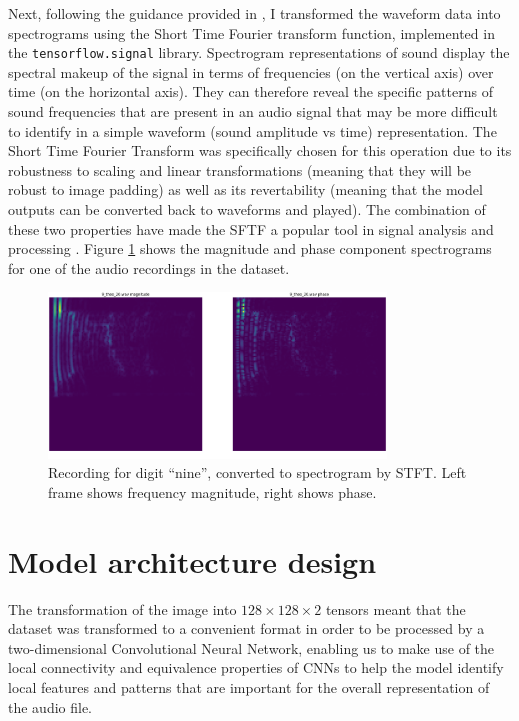 \documentclass[11pt,a4paper]{article}
\begin{document}
Next, following the guidance provided in \cite{audio_deep_learning,audio_deep_learning},
I transformed the waveform data into spectrograms using the Short Time Fourier transform
function, implemented in the \verb|tensorflow.signal| library. Spectrogram representations
of sound display the spectral makeup of the signal in terms of frequencies (on the vertical axis)
over time (on the horizontal axis). They can therefore reveal the specific patterns of sound
frequencies that are present in an audio signal that may be more difficult to identify in a 
simple waveform (sound amplitude vs time) representation. The Short Time Fourier Transform
was specifically chosen for this operation due to its robustness to scaling and linear transformations
(meaning that they will be robust to image padding) as well as its revertability (meaning that the model outputs
can be converted back to waveforms and played). The combination of these two properties have made
the SFTF a popular tool in signal analysis and processing \cite{short_time_fourier_transform}.
Figure \ref{fig:spectrogam_digit} shows the magnitude and phase component spectrograms
for one of the audio recordings in the dataset.

\begin{figure}[h]
    \centering
    \includegraphics[width=0.8\textwidth]{../figures/spectrograms_digit9_cropped.png}
    \caption{Recording for digit ``nine'', converted to spectrogram by STFT. Left frame shows frequency magnitude, right shows phase.}
    \label{fig:spectrogam_digit}
\end{figure}

\section{Model architecture design}

The transformation of the image into $128 \times 128 \times 2$ tensors meant that the dataset
was transformed to a convenient format in order to be processed by a two-dimensional
Convolutional Neural Network, enabling us to make use of the local connectivity and
equivalence properties of CNNs to help the model identify local features and patterns that are
important for the overall representation of the audio file. 
\end{document}
